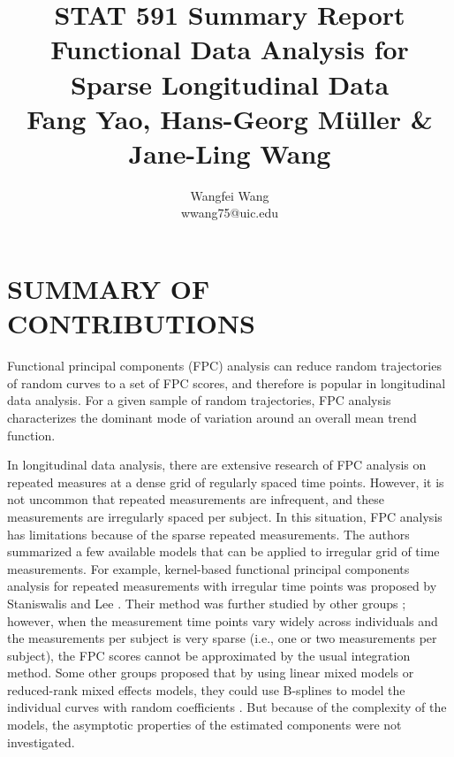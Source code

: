 \documentclass[11pt]{report}
\begin{document}
\title{
  \huge STAT 591 Summary Report \\ 
  \vspace{10mm}
  \large  Functional Data Analysis for Sparse Longitudinal Data\\
  \normalsize Fang Yao, Hans-Georg M\"{u}ller \& Jane-Ling Wang}

\author{Wangfei Wang \\ wwang75@uic.edu }

\graphicspath{{./Figures/}}

\maketitle


\section{SUMMARY OF CONTRIBUTIONS}
Functional principal components (FPC) analysis can reduce random trajectories of random curves to a set of FPC scores, and therefore is popular in longitudinal data analysis. 
For a given sample of random trajectories, FPC analysis characterizes the dominant mode of variation  around an overall mean trend function. 

In longitudinal data analysis, there are extensive research of FPC analysis on repeated measures at a dense grid of regularly spaced time points. 
However, it is not uncommon that repeated measurements are infrequent, and these measurements are irregularly spaced per subject. 
In this situation, FPC analysis has limitations because of the sparse repeated measurements. 
The authors summarized a few available models that can be applied to irregular grid of time measurements. 
For example, kernel-based functional principal components analysis for repeated measurements with irregular time points was proposed by Staniswalis and Lee \cite{Staniswalis1998}. 
Their method was further studied by other groups \cite{Besse1997, Boularan1994}; 
however, when the measurement time points vary widely across individuals and the measurements per subject is very sparse (i.e., one or two measurements per subject), the FPC scores cannot be approximated by the usual integration method. 
Some other groups proposed that by using linear mixed models or reduced-rank mixed effects models, they could use B-splines to model the individual curves with random coefficients \cite{Journal2019, Rice2001, Hastie2017, James2003}.
But because of the complexity of the models, the asymptotic properties of the estimated components were not investigated. 
\end{document}
